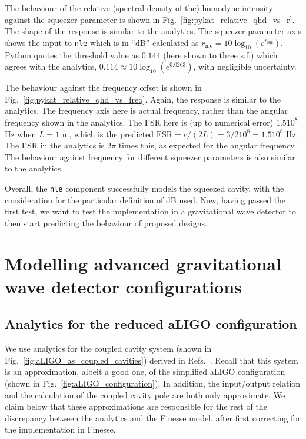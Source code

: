 \documentclass[aps,pra,superscriptaddress,reprint,nofootinbib]{revtex4-1}
\newcommand{\code}[1]{\texttt{#1}}
\begin{document}
The behaviour of the relative (spectral density of the) homodyne intensity against the squeezer parameter is shown in Fig.~\ref{fig:pykat_relative_qhd_vs_r}. The shape of the response is similar to the analytics. The squeezer parameter axis shows the input to \code{nle} which is in ``dB'' calculated as $r_{\mathrm{nle}} = 10 \log_{10}(e^{r_\mathrm{sqz}})$. Python quotes the threshold value as $0.144$ (here shown to three s.f.) which agrees with the analytics, $0.114 \approx 10 \log_{10}(e^{0.0263})$, with negligible uncertainty.


The behaviour against the frequency offset is shown in Fig.~\ref{fig:pykat_relative_qhd_vs_freq}. Again, the response is similar to the analytics. The frequency axis here is actual frequency, rather than the angular frequency shown in the analytics. The FSR here is (up to numerical error) $1.5 10^8$ Hz when $L = 1$ m, which is the predicted $\mathrm{FSR} = c/(2 L) = 3/2 10^8 = 1.5 10^8$ Hz. The FSR in the analytics is $2 \pi$ times this, as expected for the angular frequency. The behaviour against frequency for different squeezer parameters is also similar to the analytics.


Overall, the \code{nle} component successfully models the squeezed cavity, with the consideration for the particular definition of dB used. Now, having passed the first test, we want to test the implementation in a gravitational wave detector to then start predicting the behaviour of proposed designs.


\section{Modelling advanced gravitational wave detector configurations}
\label{sec:aLIGOcomparison}

\subsection{Analytics for the reduced aLIGO configuration}

We use analytics for the coupled cavity system (shown in Fig.~\ref{fig:aLIGO_as_coupled_cavities}) derived in Refs.~\cite{Korobko_2019,SOMIYA2016521}. Recall that this system is an approximation, albeit a good one, of the simplified aLIGO configuration (shown in Fig.~\ref{fig:aLIGO_configuration}). In addition, the input/output relation and the calculation of the coupled cavity pole are both only approximate. We claim below that these approximations are responsible for the rest of the discrepancy between the analytics and the Finesse model, after first correcting for the implementation in Finesse.
\end{document}
